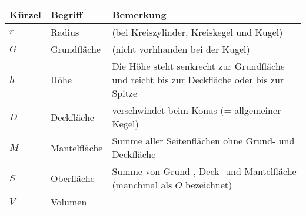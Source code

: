 \begin{tabular}{|l|l|p{12cm}|}
  \hline
  Kürzel & Begriff& Bemerkung\\\hline
  $r$  & Radius & (bei Kreiszylinder, Kreiskegel und Kugel)\\\hline
  $G$  & Grundfläche & (nicht vorhhanden bei der Kugel)\\\hline
  $h$  & Höhe & Die Höhe steht senkrecht zur Grundfläche und reicht bis zur Deckfläche oder bis zur Spitze\\\hline
  $D$  & Deckfläche & verschwindet beim Konus (= allgemeiner Kegel)\\\hline
  $M$  & Mantelfläche & Summe aller Seitenflächen ohne Grund- und Deckfläche\\\hline
  $S$  & Oberfläche & Summe von Grund-, Deck- und Mantelfläche
  (manchmal als $O$ bezeichnet)\\\hline
  $V$  & Volumen & \\\hline
  \end{tabular} 
\newpage
